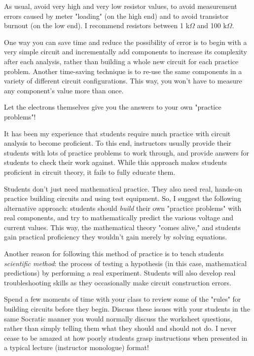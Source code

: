 As usual, avoid very high and very low resistor values, to avoid measurement errors caused by meter "loading" (on the high end) and to avoid transistor burnout (on the low end).  I recommend resistors between 1 k$\Omega$ and 100 k$\Omega$.

One way you can save time and reduce the possibility of error is to begin with a very simple circuit and incrementally add components to increase its complexity after each analysis, rather than building a whole new circuit for each practice problem.  Another time-saving technique is to re-use the same components in a variety of different circuit configurations.  This way, you won't have to measure any component's value more than once.







Let the electrons themselves give you the answers to your own "practice problems"!







It has been my experience that students require much practice with circuit analysis to become proficient.  To this end, instructors usually provide their students with lots of practice problems to work through, and provide answers for students to check their work against.  While this approach makes students proficient in circuit theory, it fails to fully educate them.

Students don't just need mathematical practice.  They also need real, hands-on practice building circuits and using test equipment.  So, I suggest the following alternative approach: students should {\it build} their own "practice problems" with real components, and try to mathematically predict the various voltage and current values.  This way, the mathematical theory "comes alive," and students gain practical proficiency they wouldn't gain merely by solving equations.

Another reason for following this method of practice is to teach students {\it scientific method}: the process of testing a hypothesis (in this case, mathematical predictions) by performing a real experiment.  Students will also develop real troubleshooting skills as they occasionally make circuit construction errors.

Spend a few moments of time with your class to review some of the "rules" for building circuits before they begin.  Discuss these issues with your students in the same Socratic manner you would normally discuss the worksheet questions, rather than simply telling them what they should and should not do.  I never cease to be amazed at how poorly students grasp instructions when presented in a typical lecture (instructor monologue) format!

